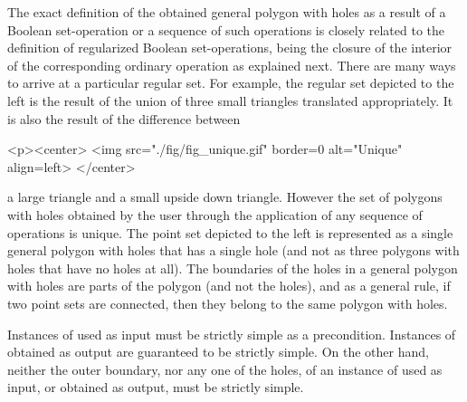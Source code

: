 The exact definition of the obtained general polygon with holes as a
result of a Boolean set-operation or a sequence of such operations is
closely related to the definition of regularized Boolean 
set-operations, being the closure of the interior of the corresponding
ordinary operation as explained next. There are many ways to arrive at a 
particular regular set. For example, the regular set depicted to the left 
is the result of the union of three small triangles translated 
appropriately. It is also the result of the difference between
\lcTex{%
  \setlength{\widthRight}{1.4cm}
  \setlength{\widthLeft}{\widthLineReal}
  \addtolength{\widthLeft}{-\widthRight}
  \begin{minipage}{\widthLeft}
}
\label{fig:unique}
\begin{ccHtmlOnly}
  <p><center>
    <img src="./fig/fig_unique.gif" border=0 alt="Unique" align=left>
  </center>
\end{ccHtmlOnly}
a large
triangle and a small upside down triangle. However the set of polygons
with holes obtained by the user through the application of any sequence
of operations is unique. 
The point set depicted to the left is represented 
as a single general polygon with holes that has a single hole 
(and not as three polygons with holes that have no holes at all). The
boundaries of the holes in a general polygon with holes are parts of the 
polygon (and not the holes), and as a general rule, if two point sets are
connected, then they belong to the same polygon with holes.
 
Instances of  used as input must be strictly simple
as a precondition. Instances of  obtained as output
are guaranteed to be strictly simple. On the other hand, neither the outer
boundary, nor any one of the holes, of an instance of
 used as input, or obtained as output,
must be strictly simple.


